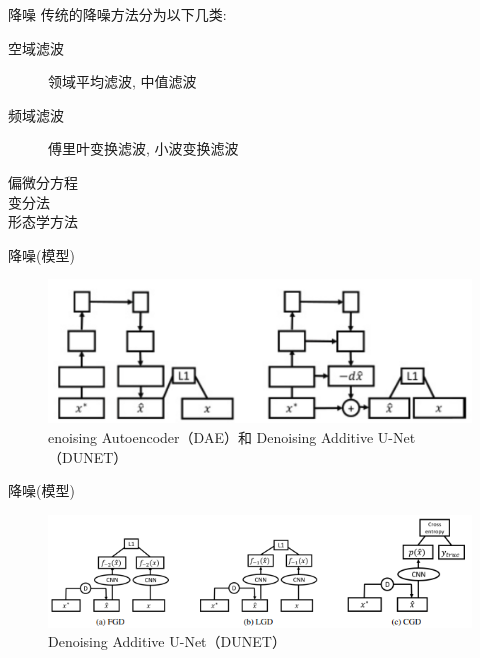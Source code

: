\documentclass[UTF8, aspectratio=169, 10pt, t]{ctexbeamer}
\begin{document}
\begin{frame}{降噪}
	传统的降噪方法分为以下几类:
	\begin{description}
		\item[空域滤波] 领域平均滤波, 中值滤波
		\item[频域滤波] 傅里叶变换滤波, 小波变换滤波
		\item[偏微分方程]  
		\item[变分法] 
		\item[形态学方法] 
	\end{description}
	
\end{frame}

\begin{frame}{降噪(模型)}
	\begin{figure}
		\centering
		\includegraphics[width=\linewidth]{dae}
		\caption{enoising Autoencoder（DAE）和 Denoising Additive U-Net（DUNET）}
		\label{fig:dae}
	\end{figure}
\end{frame}

\begin{frame}{降噪(模型)}
	\begin{figure}
		\centering
		\includegraphics[width=\linewidth]{DUNET}
		\caption{Denoising Additive U-Net（DUNET）}
		\label{fig:dunet}
	\end{figure}
\end{frame}
\end{document}
